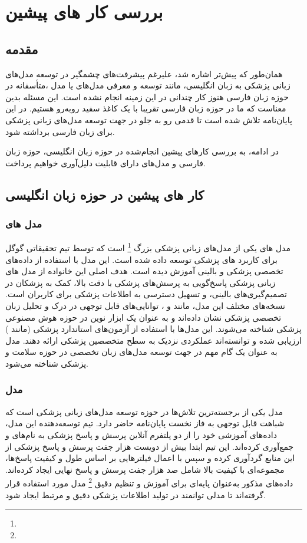 \chapter{بررسی کار های پیشین}
\section{مقدمه}
همان‌طور که پیش‌تر اشاره شد، علیرغم پیشرفت‌های چشمگیر در توسعه مدل‌های زبانی پزشکی به زبان انگلیسی، مانند توسعه و معرفی مدل‌های
\cite{b37}
\cite{b38}
یا مدل
\cite{b39}
،متأسفانه در حوزه زبان فارسی هنوز کار چندانی در این زمینه انجام نشده است. این مسئله بدین معناست که ما در حوزه زبان فارسی تقریبا با یک کاغذ سفید روبه‌رو هستیم. در این پایان‌نامه تلاش شده است تا قدمی رو به جلو در جهت توسعه مدل‌های زبانی پزشکی برای زبان فارسی برداشته شود.

در ادامه، به بررسی کارهای پیشین انجام‌شده در حوزه زبان انگلیسی، حوزه زبان فارسی و مدل‌های دارای قابلیت دلیل‌آوری خواهیم پرداخت.
\section{کار های پیشین در حوزه زبان انگلیسی}
\subsection{مدل های
}
مدل های 
یکی از مدل‌های زبانی پزشکی بزرگ 
\footnote{}
است که توسط تیم تحقیقاتی گوگل برای کاربرد های پزشکی توسعه داده شده است. این مدل با استفاده از داده‌های تخصصی پزشکی و بالینی آموزش دیده است. هدف اصلی این خانواده از مدل های زبانی پزشکی پاسخ‌گویی به پرسش‌های پزشکی با دقت بالا، کمک به پزشکان در تصمیم‌گیری‌های بالینی، و تسهیل دسترسی به اطلاعات پزشکی برای کاربران است. نسخه‌های مختلف این مدل، مانند
و
، توانایی‌های قابل توجهی در درک و تحلیل زبان تخصصی پزشکی نشان داده‌اند و به عنوان یک ابزار نوین در حوزه هوش مصنوعی پزشکی شناخته می‌شوند. این مدل‌ها با استفاده از آزمون‌های استاندارد پزشکی (مانند
) 
ارزیابی شده و توانسته‌اند عملکردی نزدیک به سطح متخصصین پزشکی ارائه دهند. مدل
به عنوان یک گام مهم در جهت توسعه مدل‌های زبان تخصصی در حوزه سلامت و پزشکی شناخته می‌شود.
\subsection{مدل 
}
مدل
\cite{b40}
یکی از برجسته‌ترین تلاش‌ها در حوزه توسعه مدل‌های زبانی پزشکی است که شباهت قابل توجهی به فاز نخست پایان‌نامه حاضر دارد. تیم توسعه‌دهنده این مدل، داده‌های آموزشی خود را از دو پلتفرم آنلاین پرسش و پاسخ پزشکی به نام‌های
و
جمع‌آوری کرده‌اند. این تیم ابتدا بیش از دویست هزار جفت پرسش و پاسخ پزشکی از این منابع گردآوری کرده و سپس با اعمال فیلترهایی بر اساس طول و کیفیت پاسخ‌ها، مجموعه‌ای با کیفیت بالا شامل صد هزار جفت پرسش و پاسخ نهایی ایجاد کرده‌اند. داده‌های مذکور به‌عنوان پایه‌ای برای آموزش و تنظیم دقیق
\footnote{}
مدل
\cite{b41}
مورد استفاده قرار گرفته‌اند تا مدلی توانمند در تولید اطلاعات پزشکی دقیق و مرتبط ایجاد شود.

